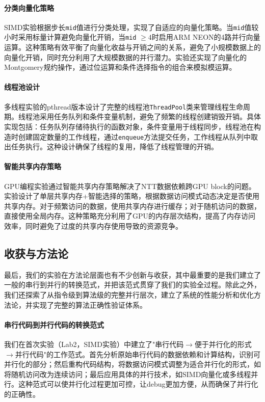 \documentclass[a4paper]{article}
\begin{document}
\paragraph{分类向量化策略} SIMD实验根据步长\texttt{mid}值进行分类处理，实现了自适应的向量化策略。当\texttt{mid}值较小时采用标量计算避免向量化开销，当\texttt{mid} $\geq 4$时启用ARM NEON的4路并行向量运算。这种策略有效平衡了向量化收益与开销之间的关系，避免了小规模数据上的向量化开销，同时充分利用了大规模数据的并行潜力。实验还实现了向量化的Montgomery规约操作，通过位运算和条件选择指令的组合来模拟模运算。

\paragraph{线程池设计} 多线程实验的pthread版本设计了完整的线程池\texttt{ThreadPool}类来管理线程生命周期。线程池采用任务队列和条件变量机制，避免了频繁的线程创建销毁开销。具体实现包括：任务队列存储待执行的函数对象，条件变量用于线程同步，线程池在构造时创建固定数量的工作线程，通过\texttt{enqueue}方法提交任务，工作线程从队列中取出任务执行。这种设计确保了线程的复用，降低了线程管理的开销。

\paragraph{智能共享内存策略} GPU编程实验通过智能共享内存策略解决了NTT数据依赖跨GPU block的问题。实验设计了单层共享内存+智能选择的策略，根据数据访问模式动态决定是否使用共享内存。对于频繁访问的数据，使用共享内存进行缓存；对于随机访问的数据，直接使用全局内存。这种策略充分利用了GPU的内存层次结构，提高了内存访问效率，同时避免了过度的共享内存使用导致的资源竞争。

\subsection{收获与方法论}

最后，我们的实验在方法论层面也有不少创新与收获，其中最重要的是我们建立了一般的串行到并行的转换范式，并把该范式贯穿了我们的实验全过程。除此之外，我们还探索了从指令级到算法级的完整并行层次，建立了系统的性能分析和优化方法论，并实现了完整的算法正确性验证体系。

\paragraph{串行代码到并行代码的转换范式} 我们在首次实验（Lab2，SIMD实验）中建立了"串行代码$\rightarrow$便于并行化的形式$\rightarrow$并行代码"的工作范式。首先分析原始串行代码的数据依赖和计算结构，识别可并行化的部分；然后重构代码结构，将数据访问模式调整为适合并行化的形式，如将随机访问改为连续访问；最后应用具体的并行技术，如SIMD向量化或多线程并行。这种范式可以使并行化过程更加可控，让debug更加方便，从而确保了并行化的正确性。
\end{document}
